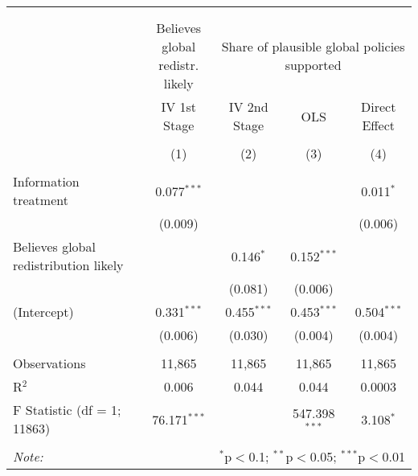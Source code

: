 
\begin{tabular}{@{\extracolsep{5pt}}lcccc} 
\\[-1.8ex]\hline 
\hline \\[-1.8ex] 
\\[-1.8ex] & \makecell{Believes global\\redistr. likely} & \multicolumn{3}{c}{Share of plausible global policies supported} \\ 
 & IV 1st Stage & IV 2nd Stage & OLS & Direct Effect \\ 
\\[-1.8ex] & (1) & (2) & (3) & (4)\\ 
\hline \\[-1.8ex] 
 Information treatment & 0.077$^{***}$ &  &  & 0.011$^{*}$ \\ 
  & (0.009) &  &  & (0.006) \\ 
  Believes global redistribution likely &  & 0.146$^{*}$ & 0.152$^{***}$ &  \\ 
  &  & (0.081) & (0.006) &  \\ 
  (Intercept) & 0.331$^{***}$ & 0.455$^{***}$ & 0.453$^{***}$ & 0.504$^{***}$ \\ 
  & (0.006) & (0.030) & (0.004) & (0.004) \\ 
 \hline \\[-1.8ex] 
Observations & 11,865 & 11,865 & 11,865 & 11,865 \\ 
R$^{2}$ & 0.006 & 0.044 & 0.044 & 0.0003 \\ 
F Statistic (df = 1; 11863) & 76.171$^{***}$ &  & 547.398$^{***}$ & 3.108$^{*}$ \\ 
\hline 
\hline \\[-1.8ex] 
\textit{Note:}  & \multicolumn{4}{r}{$^{*}$p$<$0.1; $^{**}$p$<$0.05; $^{***}$p$<$0.01} \\ 
\end{tabular} 
